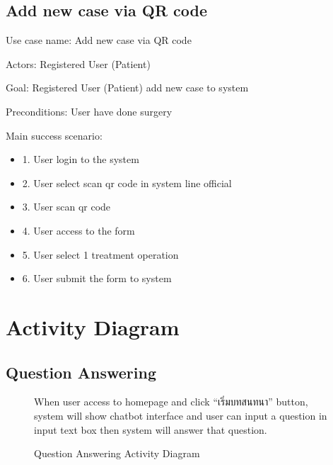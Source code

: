 \documentclass[12pt,oneside,openright,a4paper]{cpe-english-project}
\begin{document}
      \subsection{Add new case via QR code}
        \qquad Use case name: Add new case via QR code \par
        \qquad Actors: Registered User (Patient) \par
        \qquad Goal: Registered User (Patient) add new case to system \par
        \qquad Preconditions: User have done surgery \par
        \qquad Main success scenario:
        \begin{itemize}
          \item[] 1. User login to the system
          \item[] 2. User select scan qr code in system line official
          \item[] 3. User scan qr code
          \item[] 4. User access to the form
          \item[] 5. User select 1 treatment operation
          \item[] 6. User submit the form to system
        \end{itemize}

\newpage
    \section{Activity Diagram}
      \subsection{Question Answering}
      \begin{figure}[!h]
        \centering
        \caption{Question Answering Activity Diagram}\label{fig:AD_FAQ}
        \begin{flushleft}
          \qquad When user access to homepage and click “\textthai{เริ่มบทสนทนา}” button, system will show chatbot interface and user can input a question in input text box then system will answer that question. \par
        \end{flushleft}
      \end{figure}
\end{document}
